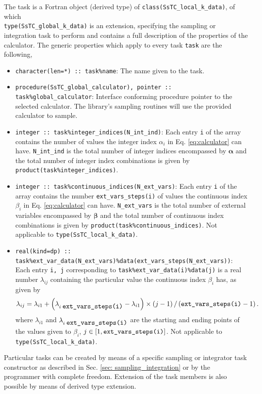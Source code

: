 \documentclass[10pt,a4paper]{article}
\begin{document}
The task is a Fortran object (derived type) of \verb|class(SsTC_local_k_data)|, of which \\ \verb|type(SsTC_global_k_data)| is an extension, specifying the sampling or integration task to perform and contains a full description of the properties of the calculator. The generic properties which apply to every task \verb|task| are the following,
\begin{itemize}
\item \verb|character(len=*) :: task%name|: The name given to the task.
\item \verb|procedure(SsTC_global_calculator), pointer :: task%global_calculator|: Interface conforming procedure pointer to the selected calculator. The library's sampling routines will use the provided calculator to sample.
\item \verb|integer :: task%integer_indices(N_int_ind)|: Each entry \verb|i| of the array contains the number of values the integer index $\alpha_i$ in Eq. \eqref{eq:calculator} can have. \verb|N_int_ind| is the total number of integer indices encompassed by $\bm{\alpha}$ and the total number of integer index combinations is given by \verb|product(task%integer_indices)|.
\item \verb|integer :: task%continuous_indices(N_ext_vars)|: Each entry \verb|i| of the array contains the number \verb|ext_vars_steps(i)| of values the continuous index $\beta_i$ in Eq. \eqref{eq:calculator} can have. \verb|N_ext_vars| is the total number of external variables encompassed by $\bm{\beta}$ and the total number of continuous index combinations is given by \verb|product(task%continuous_indices)|. Not applicable to \verb|type(SsTC_local_k_data)|.
\item \verb|real(kind=dp) :: task%ext_var_data(N_ext_vars)%data(ext_vars_steps(N_ext_vars))|: Each entry \verb|i, j| corresponding to \verb|task%ext_var_data(i)%data(j)| is a real number $\lambda_{ij}$ containing the particular value the continuous index $\beta_{i}$ has, as given by
\begin{equation}\label{eq:disc_cont}
\lambda_{ij} = \lambda_{i1} + \left(\lambda_{i\;\verb|ext_vars_steps(i)|} - \lambda_{i1}\right)\times\left(j - 1\right)/\left(\verb|ext_vars_steps(i)| - 1\right).
\end{equation}
where $\lambda_{i1}$ and $\lambda_{i\;\verb|ext_vars_steps(i)|}$  are the starting and ending points of the values given to $\beta_{i}$, $j\in [1, \verb|ext_vars_steps(i)|]$. Not applicable to \verb|type(SsTC_local_k_data)|.
\end{itemize}
Particular tasks can be created by means of a specific sampling or integrator task constructor as described in Sec. \ref{sec: sampling_integration} or by the programmer with complete freedom. Extension of the task members is also possible by means of derived type extension.
\end{document}

